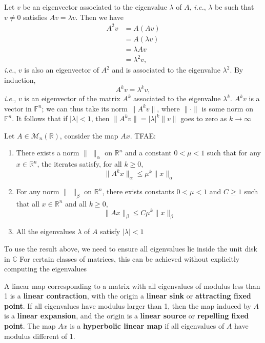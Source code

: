 \documentclass{beamer}
\def\IC{\mathbb{C}}
\def\IF{\mathbb{F}}
\def\IR{\mathbb{R}}
\def\M{\mathcal{M}}
\def\ie{\emph{i.e.}}
\def\defword#1{\textbf{#1}}
\begin{document}
\begin{frame}
Let $v$ be an eigenvector associated to the eigenvalue $\lambda$ of $A$, \ie, $\lambda$ be such that $v\neq 0$ satisfies $Av=\lambda v$. Then we have
 \begin{align*}
 A^2v &= A(Av) \\
 &=A(\lambda v) \\
 &=\lambda Av \\
 &=\lambda^2 v,
 \end{align*}
\ie, $v$ is also an eigenvector of $A^2$ and is associated to the eigenvalue $\lambda^2$.
By induction,
\[
A^kv=\lambda^k v,
\]
\ie, $v$ is an eigenvector of the matrix $A^k$ associated to the eigenvalue $\lambda^k$. $A^kv$ is a vector in $\IF^n$; we can thus take its norm $\|A^kv\|$, where $\|\cdot\|$ is some norm on $\IF^n$. It follows that if $|\lambda|<1$, then $\|A^kv\|=|\lambda|^k\|v\|$ goes to zero as $k\to\infty$
\end{frame}


\begin{frame}
\begin{theorem}\label{th:TFAE_DE}
Let $A\in\M_n(\IR)$, consider the map $Ax$. TFAE:
\begin{enumerate}
\item There exists a norm $\|\;\|_\alpha$ on $\IR^n$ and a constant $0<\mu<1$ such that for any $x\in\IR^n$, the iterates satisfy, for all $k\geq 0$,
\[
\|A^kx\|_\alpha\leq \mu^k\|x\|_\alpha
\]
\item For any norm $\|\;\|_\beta$ on $\IR^n$, there exists constants $0<\mu<1$ and $C\geq 1$ such that all $x\in\IR^n$ and all $k\geq 0$,
\[
\|Ax\|_\beta\leq C\mu^k\|x\|_\beta
\]
\item All the eigenvalues $\lambda$ of $A$ satisfy $|\lambda|<1$
\end{enumerate}
\end{theorem}
\end{frame}

\begin{frame}
To use the result above, we need to ensure all eigenvalues lie inside the unit disk in $\IC$
\vfill
For certain classes of matrices, this can be achieved without explicitly computing the eigenvalues
\vfill

A linear map corresponding to a matrix with all eigenvalues of modulus less than 1 is a \defword{linear contraction}, with the origin a \defword{linear sink} or \defword{attracting fixed point}. If all eigenvalues have modulus larger than 1, then the map induced by $A$ is a \defword{linear expansion}, and the origin is a \defword{linear source} or \defword{repelling fixed point}.
The map $Ax$ is a \defword{hyperbolic linear map} if all eigenvalues of $A$ have modulus different of 1.
\end{frame}
\end{document}
